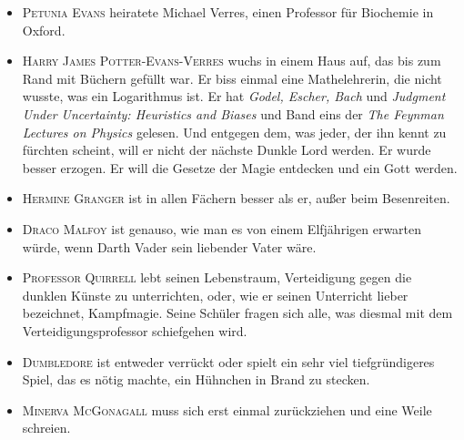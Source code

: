 \begin{itemize}
\item \textsc{Petunia Evans} heiratete Michael Verres, einen Professor für Biochemie in Oxford.
\item \textsc{Harry James Potter-Evans-Verres} wuchs in einem Haus auf, das bis zum Rand mit Büchern gefüllt war. Er biss einmal eine Mathelehrerin, die nicht wusste, was ein Logarithmus ist. Er hat \emph{Godel, Escher, Bach} und \emph{Judgment Under Uncertainty: Heuristics and Biases} und Band eins der \emph{The Feynman Lectures on Physics} gelesen. Und entgegen dem, was jeder, der ihn kennt zu fürchten scheint, will er nicht der nächste Dunkle Lord werden. Er wurde besser erzogen. Er will die Gesetze der Magie entdecken und ein Gott werden.
\item \textsc{Hermine Granger} ist in allen Fächern besser als er, außer beim Besenreiten.
\item \textsc{Draco Malfoy} ist genauso, wie man es von einem Elfjährigen erwarten würde, wenn Darth Vader sein liebender Vater wäre.
\item \textsc{Professor Quirrell} lebt seinen Lebenstraum, Verteidigung gegen die dunklen Künste zu unterrichten, oder, wie er seinen Unterricht lieber bezeichnet, Kampfmagie. Seine Schüler fragen sich alle, was diesmal mit dem Verteidigungsprofessor schiefgehen wird.
\item \textsc{Dumbledore} ist entweder verrückt oder spielt ein sehr viel tiefgründigeres Spiel, das es nötig machte, ein Hühnchen in Brand zu stecken.
\item \textsc{Minerva McGonagall} muss sich erst einmal zurückziehen und eine Weile schreien.
\end{itemize}


